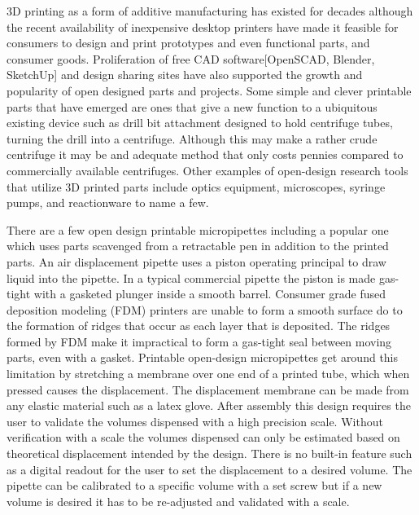\documentclass[10pt,letterpaper]{article}
\begin{document}
3D printing as a form of additive manufacturing has existed for decades although the recent availability of inexpensive desktop printers\cite{MakerbotIndustries2016,Reprap2015} have made it feasible for consumers to design and print prototypes and even functional parts, and consumer goods\cite{Fullerton2014}.
Proliferation of free CAD software[OpenSCAD, Blender, SketchUp] and design sharing sites\cite{MakerbotIndustries2016,NationalInstitutesofHealth2015,grabCAD,GitHubInc.2016} have also supported the growth and popularity of open designed parts and projects.
Some simple and clever printable parts that have emerged are ones that give a new function to a ubiquitous existing device such as drill bit attachment designed to hold centrifuge tubes, turning the drill into a centrifuge\cite{Garvey2009}.
Although this may make a rather crude centrifuge it may be and adequate method that only costs pennies compared to commercially available centrifuges.
Other examples of open-design research tools that utilize 3D printed parts include optics equipment\cite{Zhang2013}, microscopes\cite{Baden2014a,Walus2014}, syringe pumps\cite{Wijnen2014}, and reactionware\cite{Symes2012} to name a few.

There are a few open design printable micropipettes including a popular one which uses parts scavenged from a retractable pen in addition to the printed parts\cite{Baden2014}.
An air displacement pipette uses a piston operating principal to draw liquid into the pipette.
In a typical commercial pipette the piston is made gas-tight with a gasketed plunger inside a smooth barrel.
Consumer grade fused deposition modeling (FDM) printers are unable to form a smooth surface do to the formation of ridges that occur as each layer that is deposited.
The ridges formed by FDM make it impractical to form a gas-tight seal between moving parts, even with a gasket.
Printable open-design micropipettes get around this limitation by stretching a membrane over one end of a printed tube, which when pressed causes the displacement.
The displacement membrane can be made from any elastic material such as a latex glove.
After assembly this design requires the user to validate the volumes dispensed with a high precision scale.
Without verification with a scale the volumes dispensed can only be estimated based on theoretical displacement intended by the design.
There is no built-in feature such as a digital readout for the user to set the displacement to a desired volume.
The pipette can be calibrated to a specific volume with a set screw but if a new volume is desired it has to be re-adjusted and validated with a scale.
\end{document}
